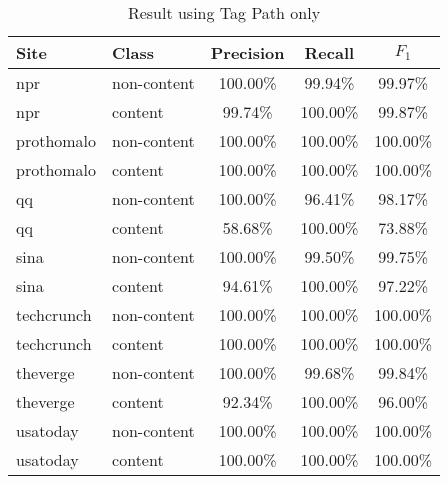\documentclass{acm_proc_article-sp}
\begin{document}
\begin{table}
\centering
\caption{\label{table:tagpath}Result using Tag Path only}
\begin{tabular}{|l|l|c|c|c|} \hline
Site&Class&Precision&Recall&$F_1$\\ \hline\hline
npr&non-content&100.00\%&99.94\%&99.97\%\\ \hline
npr&content&99.74\%&100.00\%&99.87\%\\ \hline
prothomalo&non-content&100.00\%&100.00\%&100.00\%\\ \hline
prothomalo&content&100.00\%&100.00\%&100.00\%\\ \hline
qq&non-content&100.00\%&96.41\%&98.17\%\\ \hline
qq&content&58.68\%&100.00\%&73.88\%\\ \hline
sina&non-content&100.00\%&99.50\%&99.75\%\\ \hline
sina&content&94.61\%&100.00\%&97.22\%\\ \hline
techcrunch&non-content&100.00\%&100.00\%&100.00\%\\ \hline
techcrunch&content&100.00\%&100.00\%&100.00\%\\ \hline
theverge&non-content&100.00\%&99.68\%&99.84\%\\ \hline
theverge&content&92.34\%&100.00\%&96.00\%\\ \hline
usatoday&non-content&100.00\%&100.00\%&100.00\%\\ \hline
usatoday&content&100.00\%&100.00\%&100.00\%\\ \hline
\end{tabular}
\end{table}
\end{document}
